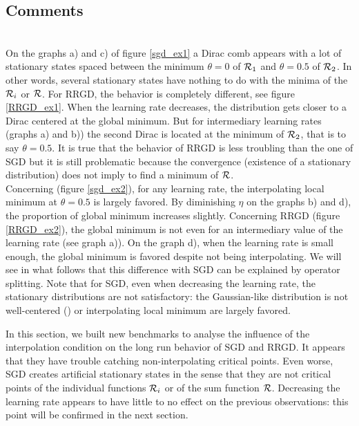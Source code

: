 \documentclass[article,authoryear,jmlmc]{beg_32}             %
\begin{document}
\subsection{Comments}
~~\\
On the graphs a) and c) of figure \ref{sgd_ex1} a Dirac comb appears with a lot of stationary states spaced between the minimum $\theta=0$ of $\mathcal{R}_1$ and $\theta=0.5$ of $\mathcal{R}_2$. In
other words, several stationary states have nothing to do with the minima of the $\mathcal{R}_i$ or $\mathcal{R}$. 
 For RRGD, the behavior is completely different, see figure \ref{RRGD_ex1}. When the learning rate decreases, the distribution gets closer to a Dirac centered at the global
 minimum. But for intermediary learning rates (graphs a) and b)) the second Dirac is located at the minimum of $\mathcal{R}_2$, that is to say $\theta=0.5$. It is true that the behavior of RRGD is less troubling than the one of SGD but it is still problematic because the convergence (existence of a stationary distribution) does not imply to find a minimum of $\mathcal{R}$. \\
Concerning \exTwo (figure \ref{sgd_ex2}), for any learning rate, the interpolating local minimum at $\theta=0.5$ is largely favored. By diminishing $\eta$ on the graphs b) and d), the proportion of global minimum increases slightly. 
Concerning RRGD (figure \ref{RRGD_ex2}), the global minimum is not  even for an intermediary value of the learning rate (see graph a)). On the graph d), when the learning rate is small enough, the global minimum is favored despite not being interpolating. We will see in what follows that this difference with SGD can be explained by operator splitting. 
Note that for SGD, even when decreasing the learning rate, the stationary distributions are not satisfactory: the Gaussian-like distribution is not well-centered (\exOne) or interpolating local minimum are largely favored.

In this section, we built new benchmarks to analyse the influence of the interpolation condition on the long run behavior of SGD and RRGD. It appears that they have trouble
catching non-interpolating critical points. Even worse, SGD creates artificial stationary states in the sense that they are not critical points of the individual functions $\mathcal{R}_i$
or of the sum function $\mathcal{R}$. Decreasing the learning rate appears to have little to no effect on the previous observations: this point will be confirmed in the next section. 
\end{document}

